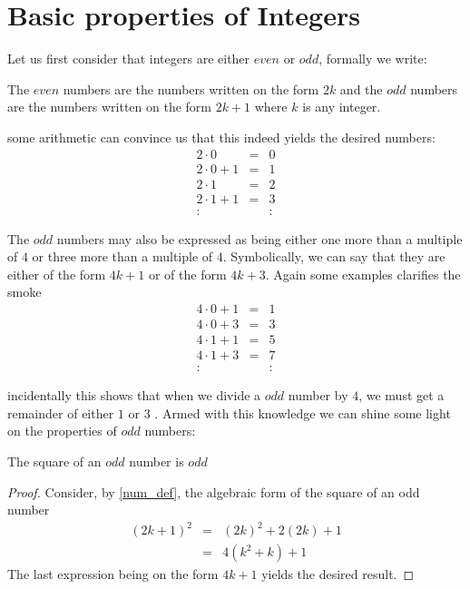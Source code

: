 \section{Basic properties of Integers}
Let us first consider that integers are either $even$ or $odd$, formally we
write:
\begin{definition}\label{num_def}
The $even$ numbers are the numbers written on the form $2k$ and the $odd$ numbers are the numbers written on the form $2k+1$ where $k$ is any integer.
\end{definition}
some arithmetic can convince us that this indeed yields the desired numbers:
\[
\begin{array}{lcl}
2 \cdot 0     & = & 0 \\
2 \cdot 0 + 1 & = & 1 \\
2 \cdot 1     & = & 2 \\
2 \cdot 1 + 1 & = & 3 \\
:             &   & :
\end{array}
\]

The $odd$ numbers may also be expressed as being either one more than a
multiple of $4$ or three more than a multiple of $4$. Symbolically, we can say
that they are either of the form $4k + 1$ or of the form $4k  + 3$. Again some
examples clarifies the smoke
\[
\begin{array}{lcl}
4 \cdot 0 + 1 & = & 1 \\
4 \cdot 0 + 3 & = & 3 \\
4 \cdot 1 + 1 & = & 5 \\
4 \cdot 1 + 3 & = & 7 \\
:             &   & :
\end{array}
\]

incidentally this shows that when we divide a $odd$ number by $4$, we must get
a remainder of either $1$ or $3$ \label{remainder}. Armed with this knowledge
we can shine some light on the properties of $odd$ numbers:
\begin{corollary}
The square of an $odd$ number is $odd$
\end{corollary}
\begin{proof}
Consider, by \ref{num_def}, the algebraic form of the square of an odd number
\[
\begin{array}{lcl}
(2k+1)^2 & = & (2k)^2 + 2(2k) + 1 \\
                 & = & 4(k^2 + k) + 1
\end{array}
\]
The last expression being on the form $4k + 1$ yields the desired result.
\end{proof}

